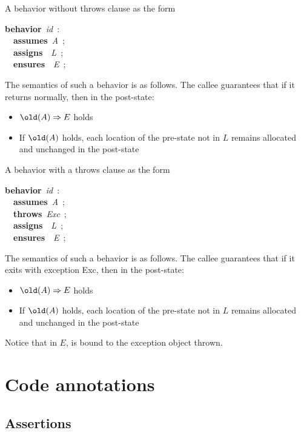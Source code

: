 \documentclass[a4paper,11pt,twoside,openright]{report}
\begin{document}
A behavior without throws clause as the form
\begin{flushleft}\ttfamily\upshape\parindent 0pt
\begin{slshape}\color{blue}\textbf{behavior}~\textsl{id}~:~\\
~~\textbf{assumes}~\textsl{A}~;~\\
~~\textbf{assigns}~~\textsl{L}~;~\\
~~\textbf{ensures}~~\textsl{E}~;~\end{slshape}
\end{flushleft}
The semantics of such a behavior is as follows. The callee guarantees
that if it returns normally, then in the post-state:
\begin{itemize}
\item $\bskw{old}(A) \Rightarrow E$ holds
\item If $\bskw{old}(A)$ holds, each location of the pre-state not
  in $L$ remains allocated and unchanged in
  the post-state
\end{itemize}

A behavior with a throws clause as the form
\begin{flushleft}\ttfamily\upshape\parindent 0pt
\begin{slshape}\color{blue}\textbf{behavior}~\textsl{id}~:~\\
~~\textbf{assumes}~\textsl{A}~;~\\
~~\textbf{throws}~\textsl{Exc}~;~\\
~~\textbf{assigns}~~\textsl{L}~;~\\
~~\textbf{ensures}~~\textsl{E}~;~\end{slshape}
\end{flushleft}
The semantics of such a behavior is as follows. The callee guarantees
that if it exits with exception Exc, then in the post-state:
\begin{itemize}
\item $\bskw{old}(A) \Rightarrow E$ holds
\item If $\bskw{old}(A)$ holds, each location of the pre-state not
  in $L$ remains allocated and unchanged in
  the post-state
\end{itemize}
Notice that in $E$,  is bound to the exception object thrown.


\section{Code annotations}

\subsection{Assertions}
\end{document}
